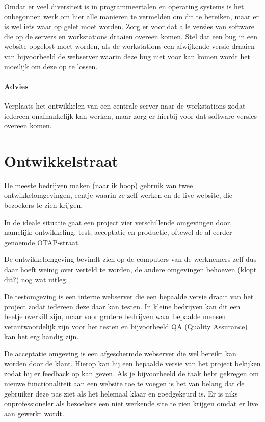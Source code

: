 Omdat er veel diversiteit is in programmeertalen en operating systems is het onbegonnen werk om hier alle manieren te vermelden om dit te bereiken, maar er is wel iets waar op gelet moet worden. Zorg er voor dat alle versies van software die op de servers en workstations draaien overeen komen. Stel dat een bug in een website opgelost moet worden, als de workstations een afwijkende versie draaien van bijvoorbeeld de webserver waarin deze bug niet voor kan komen wordt het moeilijk om deze op te lossen.

\paragraph{Advies} Verplaats het ontwikkelen van een centrale server naar de workstations zodat iedereen onafhankelijk kan werken, maar zorg er hierbij voor dat software versies overeen komen.

\section{Ontwikkelstraat}

De meeste bedrijven maken (naar ik hoop) gebruik van twee ontwikkelomgevingen, eentje waarin ze zelf werken en de live website, die bezoekers te zien krijgen.

In de ideale situatie gaat een project vier verschillende omgevingen door, namelijk: ontwikkeling, test, acceptatie en productie, oftewel de al eerder genoemde OTAP-straat. 

De ontwikkelomgeving bevindt zich op de computers van de werknemers zelf dus daar hoeft weinig over verteld te worden, de andere omgevingen behoeven (klopt dit?) nog wat uitleg.

De testomgeving is een interne webserver die een bepaalde versie draait van het project zodat iedereen deze daar kan testen. In kleine bedrijven kan dit een beetje overkill zijn, maar voor grotere bedrijven waar bepaalde mensen verantwoordelijk zijn voor het testen en bijvoorbeeld QA (Quality Assurance) kan het erg handig zijn.

De acceptatie omgeving is een afgeschermde webserver die wel bereikt kan worden door de klant. Hierop kan hij een bepaalde versie van het project bekijken zodat hij er feedback op kan geven. Als je bijvoorbeeld de taak hebt gekregen om nieuwe functionaliteit aan een website toe te voegen is het van belang dat de gebruiker deze pas ziet als het helemaal klaar en goedgekeurd is. Er is niks onprofessioneler als bezoekers een niet werkende site te zien krijgen omdat er live aan gewerkt wordt.

